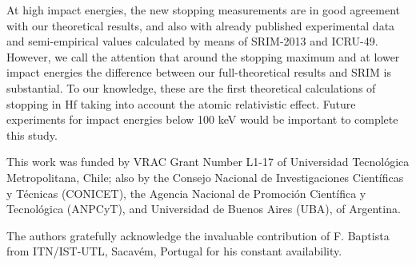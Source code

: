 \documentclass[aps,prb,reprint,groupedaddress]{revtex4-1}
\begin{document}
At high impact energies, the new stopping  measurements are in good agreement with our theoretical results, and also with already published experimental data and semi-empirical values calculated by means of SRIM-2013 and ICRU-49.  However, we call the attention that around the stopping maximum and at lower impact energies the difference between our full-theoretical results and SRIM is substantial. To our knowledge, these are the first theoretical calculations of stopping in Hf taking into account the atomic relativistic effect.
Future experiments for impact energies below 100 keV would be important to complete this study.
\begin{acknowledgments}
This work was funded by VRAC Grant Number L1-17 of Universidad Tecnol\'ogica Metropolitana, Chile; also by the Consejo Nacional de Investigaciones Científicas y Técnicas (CONICET), the Agencia Nacional de Promoción Científica y Tecnológica (ANPCyT), and Universidad de Buenos Aires (UBA), of Argentina.

The authors gratefully acknowledge the invaluable contribution of F. Baptista from ITN/IST-UTL, Sacav\'{e}m, Portugal for his constant availability. 
\end{acknowledgments}
\end{document}
